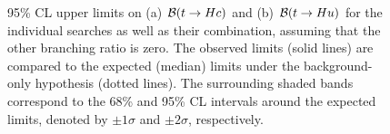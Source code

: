 \begin{figure}[htbp]
\begin{center}
\caption{\small {95\% CL upper limits on (a) $\mathcal{B}(t\to Hc)$ and (b) $\mathcal{B}(t\to Hu)$ for the individual searches as well as their
combination, assuming that the other branching ratio is zero. The observed limits (solid lines) are compared to the 
expected (median) limits under the background-only
hypothesis (dotted lines). The surrounding shaded bands correspond to the 68\% and 95\% CL intervals around the expected limits, 
denoted by $\pm 1\sigma$ and $\pm 2\sigma$, respectively.
}}
\label{fig:limits_combo_1D} 
\end{center}
\end{figure}


